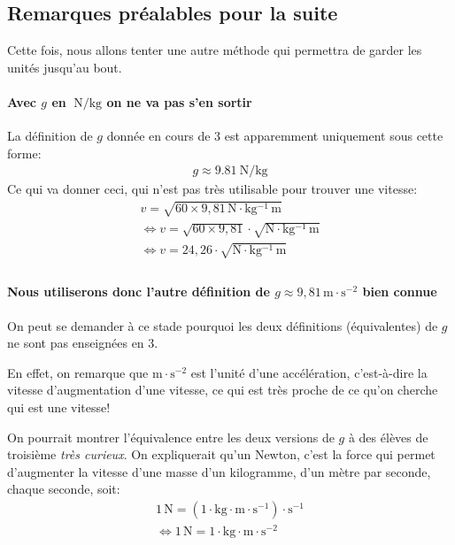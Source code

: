 \subsection{Remarques préalables pour la suite}
Cette fois, nous allons tenter une autre méthode qui permettra de garder les unités jusqu'au bout.
\paragraph{Avec $g$ en $\SI{}{\newton\per\kg}$ on ne va pas s'en sortir}
La définition de $g$ donnée en cours de 3\ieme{} est apparemment uniquement sous cette forme:
\begin{gather*}
    g \approx \SI{9.81}{\newton\per\kg}
\end{gather*}
Ce qui va donner ceci, qui n'est pas très utilisable pour trouver une vitesse:
\begin{gather*}
    v=\sqrt{60 \times9{,}81 \,\mathrm{N \cdot kg^{-1}}\,\mathrm{m}} \\
    \iff v=\sqrt{60 \times9{,}81}\cdot\sqrt{\mathrm{N \cdot kg^{-1}}\,\mathrm{m}} \\
    \iff v=24,26 \cdot\sqrt{\mathrm{N \cdot kg^{-1}}\,\mathrm{m}} \\
\end{gather*}
\paragraph{Nous utiliserons donc l'autre définition de $g \approx 9{,}81 \,\mathrm{m \cdot s^{-2}}$ bien connue}

On peut se demander à ce stade pourquoi les deux définitions (équivalentes) de $g$ ne sont pas enseignées en 3\ieme{}.

En effet, on remarque que $\mathrm{m \cdot s^{-2}}$ est l'unité d'une accélération, c'est-à-dire la vitesse d'augmentation d'une vitesse, ce qui est très proche de ce qu'on cherche qui est une vitesse!

On pourrait montrer l'équivalence entre les deux versions de $g$ à des élèves de troisième \textit{très curieux}. On expliquerait qu'un Newton, c'est la force qui permet d'augmenter la vitesse d'une masse d'un kilogramme, d'un mètre par seconde, chaque seconde, soit:
\begin{gather*}
    1\,\mathrm{N}= (1\cdot \mathrm{kg \cdot m\cdot s^{-1}})\cdot \mathrm{s^{-1}} \\
    \iff 1\,\mathrm{N}= 1\cdot \mathrm{kg \cdot m\cdot s^{-2}}
\end{gather*}


